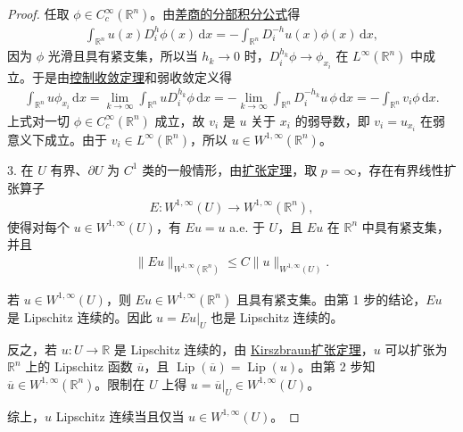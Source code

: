 \documentclass[../../main.tex]{subfiles}
\begin{document}
\begin{proof}
任取 $\phi\in C^{\infty}_{c}(\mathbb{R}^{n})$。由\hyperref[theorem:ch05-差商的分部积分公式]{差商的分部积分公式}得
\begin{align*}
\int_{\mathbb{R}^{n}}u(x)D_{i}^{h}\phi(x)\,\mathrm{d}x
=-\int_{\mathbb{R}^{n}}D_{i}^{-h}u(x)\phi(x)\,\mathrm{d}x,
\end{align*}
因为 $\phi$ 光滑且具有紧支集，所以当 $h_{k}\to 0$ 时，$D_{i}^{h_{k}}\phi\to\phi_{x_{i}}$ 在 $L^{\infty}(\mathbb{R}^{n})$ 中成立。于是由\hyperref[Real Analysis-theorem:控制收敛定理]{控制收敛定理}和弱收敛定义得
\begin{align*}
\int_{\mathbb{R}^{n}}u\phi_{x_{i}}\,\mathrm{d}x
=\lim_{k\to\infty}\int_{\mathbb{R}^{n}}uD_{i}^{h_{k}}\phi\,\mathrm{d}x=-\lim_{k\to\infty}\int_{\mathbb{R}^{n}}D_{i}^{-h_{k}}u\,\phi\,\mathrm{d}x
=-\int_{\mathbb{R}^{n}}v_{i}\phi\,\mathrm{d}x.
\end{align*}
上式对一切 $\phi\in C^{\infty}_{c}(\mathbb{R}^{n})$ 成立，故 $v_{i}$ 是 $u$ 关于 $x_{i}$ 的弱导数，即 $v_{i}=u_{x_{i}}$ 在弱意义下成立。由于 $v_{i}\in L^{\infty}(\mathbb{R}^{n})$，所以 $u\in W^{1,\infty}(\mathbb{R}^{n})$。

3. 在 $U$ 有界、$\partial U$ 为 $C^{1}$ 类的一般情形，由\hyperref[theorem:ch05-扩张定理]{扩张定理}，取 $p=\infty$，存在有界线性扩张算子
\begin{align*}
E:W^{1,\infty}(U)\to W^{1,\infty}(\mathbb{R}^{n}),
\end{align*}
使得对每个 $u\in W^{1,\infty}(U)$，有 $Eu=u$ a.e. 于 $U$，且 $Eu$ 在 $\mathbb{R}^{n}$ 中具有紧支集，并且
\begin{align*}
\|Eu\|_{W^{1,\infty}(\mathbb{R}^{n})}\leqslant C\|u\|_{W^{1,\infty}(U)}.
\end{align*}

若 $u\in W^{1,\infty}(U)$，则 $Eu\in W^{1,\infty}(\mathbb{R}^{n})$ 且具有紧支集。由第 1 步的结论，$Eu$ 是 Lipschitz 连续的。因此 $u=Eu|_{U}$ 也是 Lipschitz 连续的。

反之，若 $u:U\to\mathbb{R}$ 是 Lipschitz 连续的，由 \hyperref[theorem:实值-Kirszbraun扩张定理]{Kirszbraun扩张定理}，$u$ 可以扩张为 $\mathbb{R}^{n}$ 上的 Lipschitz 函数 $\overline{u}$，且 $\operatorname{Lip}(\overline{u})=\operatorname{Lip}(u)$。由第 2 步知 $\overline{u}\in W^{1,\infty}(\mathbb{R}^{n})$。限制在 $U$ 上得 $u=\overline{u}|_{U}\in W^{1,\infty}(U)$。

综上，$u$ Lipschitz 连续当且仅当 $u\in W^{1,\infty}(U)$。
\end{proof}
\end{document}
